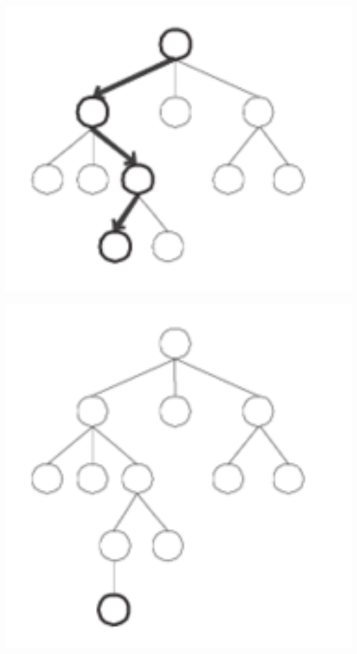 \documentclass[a4paper,12pt]{scrartcl}
\begin{document}
\begin{minipage}[b]{0.3\textwidth}
		\includegraphics[width=1.0\textwidth]{pics/selection.png}
		
		\includegraphics[width=1.0\textwidth]{pics/expansion.png}
		

\end{minipage}
\end{document}
